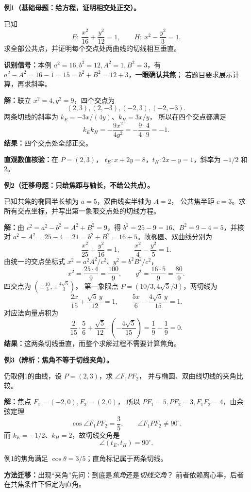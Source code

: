 \clearpage
\begin{examplebox}
\textbf{例1（基础母题：给方程，证明相交处正交）。}

已知
\[
E:\ \frac{x^2}{16}+\frac{y^2}{12}=1,\qquad
H:\ x^2-\frac{y^2}{3}=1.
\]
求全部公共点，并证明每个交点处两曲线的切线相互垂直。

\textbf{识别信号：}本例 $a^2=16,b^2=12,A^2=1,B^2=3$，有
$a^2-A^2=16-1=15=b^2+B^2=12+3$，\textbf{一眼确认共焦}；
若题目要求展示计算，再求斜率。

\textbf{解：}联立 $x^2=4,y^2=9$，四个交点为
\[
\boxed{(2,3),(2,-3),(-2,3),(-2,-3)}.
\]
两条切线的斜率为 $k_E=-3x/(4y)$、$k_H=3x/y$，
所以在四个交点都满足
\[
k_Ek_H=-\frac{9x^2}{4y^2}
=-\frac{9\cdot4}{4\cdot9}=-1.
\]
\textbf{结果：}四个交点处全部正交。

\textbf{直观数值核验：}在 $P=(2,3)$，
$t_E:x+2y=8$，$t_H:2x-y=1$，斜率为 $-1/2$ 和 $2$。
\end{examplebox}

\clearpage
\begin{examplebox}
\textbf{例2（迁移母题：只给焦距与轴长，不给公共点）。}

已知共焦的椭圆半长轴为 $a=5$，双曲线实半轴为 $A=2$，
公共焦半距 $c=3$。求所有交点坐标，并写出第一象限交点处的切线方程。

\textbf{解：}由 $c^2=a^2-b^2=A^2+B^2=9$，得
$b^2=25-9=16$、$B^2=9-4=5$，并核对
$a^2-A^2=25-4=21=b^2+B^2=16+5$。故椭圆、双曲线分别为
\[
\frac{x^2}{25}+\frac{y^2}{16}=1,\qquad
\frac{x^2}{4}-\frac{y^2}{5}=1.
\]
由统一的交点坐标式 $x^2=a^2A^2/c^2$、$y^2=b^2B^2/c^2$，
\[
x^2=\frac{25\cdot4}{9}=\frac{100}{9},\qquad
 y^2=\frac{16\cdot5}{9}=\frac{80}{9}.
\]
四交点为 $\left(\pm\frac{10}{3},\pm\frac{4\sqrt5}{3}\right)$。
第一象限点 $P=(10/3,4\sqrt5/3)$，两切线为
\[
\frac{2x}{15}+\frac{\sqrt5\,y}{12}=1,\qquad
\frac{5x}{6}-\frac{4\sqrt5\,y}{15}=1.
\]
对应法向量点积为
\[
\frac{2}{15}\cdot\frac56
+\frac{\sqrt5}{12}\cdot\left(-\frac{4\sqrt5}{15}\right)
=\frac19-\frac19=0.
\]
\textbf{结果：}这两条切线垂直，而整个求解过程不需要计算焦角。
\end{examplebox}

\clearpage
\begin{examplebox}
\textbf{例3（辨析：焦角不等于切线夹角）。}

仍取例1的曲线，设 $P=(2,3)$，求 $\angle F_1PF_2$，
并与椭圆、双曲线切线的夹角比较。

\textbf{解：}焦点 $F_1=(-2,0),F_2=(2,0)$，
所以 $PF_1=5,PF_2=3,F_1F_2=4$，由余弦定理
\[
\boxed{\cos\angle F_1PF_2=\frac35},\qquad
\angle F_1PF_2\ne90^\circ.
\]
而 $k_E=-1/2$、$k_H=2$，故切线交角是
\[
\boxed{\angle(t_E,t_H)=90^\circ}.
\]
\begin{center}


{\small 例1的焦角满足 $\cos\theta=3/5$；直角标记属于两条切线。}
\end{center}
\textbf{方法迁移：}出现“夹角”先问：到底是\emph{焦角}还是\emph{切线交角}？
前者依赖离心率，后者在共焦条件下恒定为直角。
\end{examplebox}



